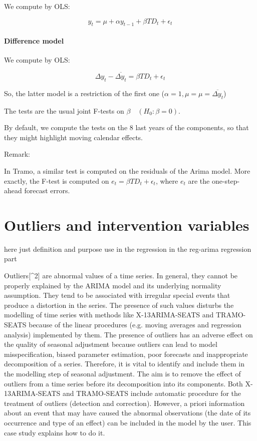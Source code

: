 \documentclass[
  letterpaper,
  DIV=11,
  numbers=noendperiod]{scrreprt}
\let\oldparagraph\paragraph
\renewcommand{\paragraph}[1]{\oldparagraph{#1}\mbox{}}
\begin{document}
We compute by OLS:

\[y_t=\mu + \alpha y_{t-1} + \beta TD_t + \epsilon_t \]

\hypertarget{difference-model}{%
\paragraph{Difference model}\label{difference-model}}

We compute by OLS:

\[\Delta y_t - \overline{\Delta y_t}=\beta TD_t + \epsilon_t \]

So, the latter model is a restriction of the first one
(\(\alpha =1, \mu =μ=\overline{\Delta y_t}\))

The tests are the usual joint F-tests on \(\beta \quad (H_0:\beta=0)\).

By default, we compute the tests on the 8 last years of the components,
so that they might highlight moving calendar effects.

Remark:

In Tramo, a similar test is computed on the residuals of the Arima
model. More exactly, the F-test is computed on
\(e_t=\beta TD_t + \epsilon_t\), where \(e_t\) are the one-step-ahead
forecast errors.

\hypertarget{outliers-and-intervention-variables}{%
\section{Outliers and intervention
variables}\label{outliers-and-intervention-variables}}

here just definition and purpose use in the regression in the reg-arima
regression part

Outliers{[}\^{}2{]} are abnormal values of a time series. In general,
they cannot be properly explained by the ARIMA model and its underlying
normality assumption. They tend to be associated with irregular special
events that produce a distortion in the series. The presence of such
values disturbs the modelling of time series with methods like
X-13ARIMA-SEATS and TRAMO-SEATS because of the linear procedures (e.g.
moving averages and regression analysis) implemented by them. The
presence of outliers has an adverse effect on the quality of seasonal
adjustment because outliers can lead to model misspecification, biased
parameter estimation, poor forecasts and inappropriate decomposition of
a series. Therefore, it is vital to identify and include them in the
modelling step of seasonal adjustment. The aim is to remove the effect
of outliers from a time series before its decomposition into its
components. Both X-13ARIMA-SEATS and TRAMO-SEATS include automatic
procedure for the treatment of outliers (detection and correction).
However, a priori information about an event that may have caused the
abnormal observations (the date of its occurrence and type of an effect)
can be included in the model by the user. This case study explains how
to do it.
\end{document}
